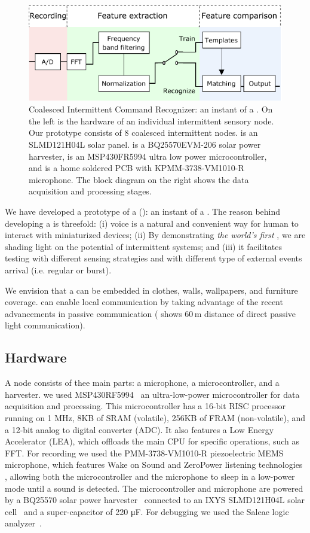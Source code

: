 \begin{figure}
	\centering
	\includegraphics[width=\columnwidth]{figures/cis}
	\caption{Coalesced Intermittent Command Recognizer: an instant of a \fullsys. On the left is the hardware of an individual intermittent sensory node. Our prototype consists of 8 coalesced intermittent nodes.  is an SLMD121H04L solar panel.  is a BQ25570EVM-206 solar power harvester,  is an MSP430FR5994 ultra low power microcontroller, and  is a home soldered PCB with KPMM-3738-VM1010-R microphone. The block diagram on the right shows the data acquisition and processing stages.}
	\label{fig:cis}
\end{figure}

We have developed a prototype of a \fullcim (\cim): an instant of a \fullsys. The reason behind developing a \cim is threefold: (i) voice is a natural and convenient way for human to interact with miniaturized devices; (ii) By demonstrating \textit{the world's first} \fullcim, we are shading light on the potential of intermittent systems; and (iii) it facilitates testing with different sensing strategies and with different type of external events arrival (i.e. regular  or burst). 

We envision that a \cim can be embedded in clothes, walls, wallpapers, and furniture coverage. \cim can enable local communication by taking advantage of the recent advancements in passive communication (\cite{marco} shows 60\,m distance of direct passive light communication). 

\subsection{Hardware}
A \cim node consists of thee main parts: a microphone, a microcontroller, and a harvester. we used MSP430RF5994~\cite{ti_msp430_website} an ultra-low-power microcontroller for data acquisition and processing. This microcontroller has a 16-bit RISC processor running on 1 MHz, 8KB of SRAM (volatile), 256KB of FRAM (non-volatile), and a 12-bit analog to digital converter (ADC). It also features a Low Energy Accelerator (LEA), which offloads the main CPU for specific operations, such as FFT. For recording we used the PMM-3738-VM1010-R piezoelectric MEMS microphone, which features Wake on Sound and ZeroPower listening technologies \cite{microphone}, allowing both the microcontroller and the microphone to sleep in a low-power mode until a sound is detected.
The microcontroller and microphone are powered by a BQ25570 solar power harvester~\cite{BQ25570EVM-206_website} connected to an IXYS SLMD121H04L solar cell~\cite{SLMD121H04L_website} and a super-capacitor of 220 \si{\micro F}. For debugging we used the Saleae logic analyzer~\cite{saleae}.

